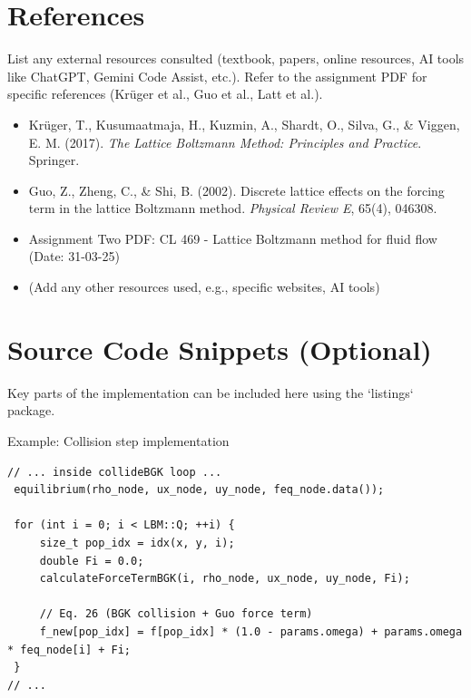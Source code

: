 \documentclass[11pt, a4paper]{article}
\begin{document}
\section*{References}
List any external resources consulted (textbook, papers, online resources, AI tools like ChatGPT, Gemini Code Assist, etc.). Refer to the assignment PDF for specific references (Krüger et al., Guo et al., Latt et al.).
\begin{itemize}
    \item Krüger, T., Kusumaatmaja, H., Kuzmin, A., Shardt, O., Silva, G., & Viggen, E. M. (2017). \textit{The Lattice Boltzmann Method: Principles and Practice}. Springer.
    \item Guo, Z., Zheng, C., & Shi, B. (2002). Discrete lattice effects on the forcing term in the lattice Boltzmann method. \textit{Physical Review E}, 65(4), 046308.
    \item Assignment Two PDF: CL 469 - Lattice Boltzmann method for fluid flow (Date: 31-03-25)
    \item (Add any other resources used, e.g., specific websites, AI tools)
\end{itemize}

\appendix
\section{Source Code Snippets (Optional)}
Key parts of the implementation can be included here using the `listings` package.

Example: Collision step implementation
\begin{lstlisting}[caption={BGK Collision with Guo Forcing in Simulation::collideBGK}, label={lst:bgk_collision}]
// ... inside collideBGK loop ...
 equilibrium(rho_node, ux_node, uy_node, feq_node.data());

 for (int i = 0; i < LBM::Q; ++i) {
     size_t pop_idx = idx(x, y, i);
     double Fi = 0.0;
     calculateForceTermBGK(i, rho_node, ux_node, uy_node, Fi);

     // Eq. 26 (BGK collision + Guo force term)
     f_new[pop_idx] = f[pop_idx] * (1.0 - params.omega) + params.omega * feq_node[i] + Fi;
 }
// ...
\end{lstlisting}
\end{document}
